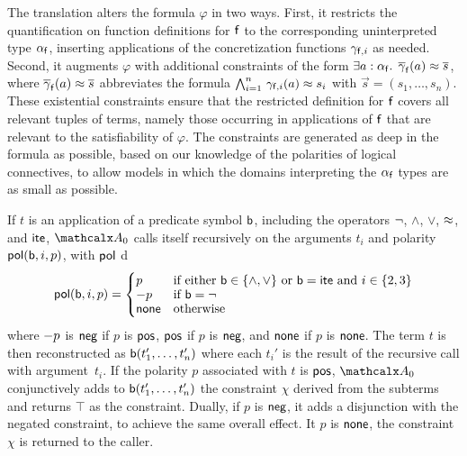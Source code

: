 
The translation alters the formula $\varphi$ in two ways. First, it restricts the
quantification on function definitions for $\mathsf{f}$ to the corresponding
uninterpreted type $\alpha_{\mathsf{f}}$, inserting applications of the concretization functions $\gamma_{\mathsf{f},i}$ as needed. 
Second, it augments $\varphi$ with additional constraints of the form
$\exists a :\nobreak \alpha_{\mathsf{f}}.\;\, \overline{\gamma}_{\mathsf{f}}( a ) \approx \overline{s}$,
where $\overline{\gamma}_{\mathsf{f}}( a ) \approx \overline{s}$ abbreviates the formula
$\bigwedge_{i=1}^n\, \gamma_{\mathsf{f},i}(a) \approx s_i$
with $\vec s = (s_1,\ldots,s_n)$.
These existential %
constraints
ensure that the restricted definition for $\mathsf{f}$ covers all relevant tuples
of terms, namely those occurring in applications of $\mathsf{f}$ 
that are relevant to the satisfiability of $\varphi$. The constraints are
generated as deep in the formula as possible, based on our knowledge of the
polarities of logical connectives, to allow models in which the domains
interpreting the $\alpha_{\mathsf{f}}$ types are as small as possible.

If $t$ is an application of a predicate symbol $\mathsf{b}$, including the
operators ${\oldneg}$, ${\wedge}$, ${\vee}$, ${\approx}$, and ${\mathsf{ite}}$,
$\conv_0$ calls itself recursively on the arguments $t_i$ and polarity $\mathsf{pol}(
\mathsf{b}, i, p )$, with $\mathsf{pol}$ d
\[\pol( \boolop, i, p ) =
\begin{cases}
p & \text{if either $\boolop \in \{{\wedge}, {\vee}\}$ or $\boolop = \lite$ and $i \in \{2, 3\}$} \\[-\jot]
\pnegate p & \text{if $\boolop = {\neg}$} \\[-\jot]
\pnone & \text{otherwise}
\end{cases}\]
where $- p$ is $\mathsf{neg}$ if $p$ is $\mathsf{pos}$, $\mathsf{pos}$
if $p$ is $\mathsf{neg}$, and $\mathsf{none}$ if $p$ is $\mathsf{none}$.
The term $t$ is then reconstructed as $\mathsf{b}(t_1',\ldots,t_n')$ 
where each $t_i'$ is the result of the recursive call with argument~$t_i$. 
If the polarity $p$ associated with $t$ is $\mathsf{pos}$, 
$\conv_0$ conjunctively adds to $\mathsf{b}(t_1',\ldots,t_n')$ the constraint $\chi$ derived from
the subterms and returns $\top$ as the constraint.
Dually, if $p$ is $\mathsf{neg}$, it adds a
disjunction with the negated constraint, to achieve the same overall effect.
It $p$ is $\mathsf{none}$, the constraint $\chi$ is
returned to the caller.

